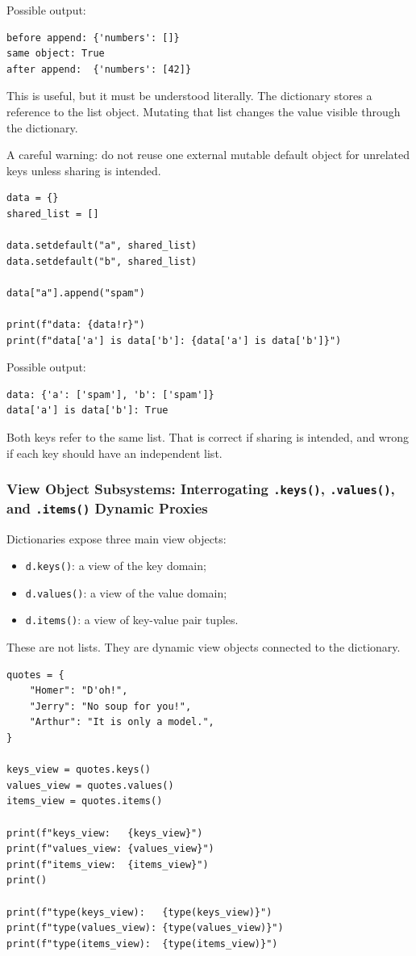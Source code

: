 Possible output:

\begin{verbatim}
before append: {'numbers': []}
same object: True
after append:  {'numbers': [42]}
\end{verbatim}

This is useful, but it must be understood literally. The dictionary stores a reference to the list object. Mutating that list changes the value visible through the dictionary.

A careful warning: do not reuse one external mutable default object for unrelated keys unless sharing is intended.

\begin{verbatim}
data = {}
shared_list = []

data.setdefault("a", shared_list)
data.setdefault("b", shared_list)

data["a"].append("spam")

print(f"data: {data!r}")
print(f"data['a'] is data['b']: {data['a'] is data['b']}")
\end{verbatim}

Possible output:

\begin{verbatim}
data: {'a': ['spam'], 'b': ['spam']}
data['a'] is data['b']: True
\end{verbatim}

Both keys refer to the same list. That is correct if sharing is intended, and wrong if each key should have an independent list.

\subsubsection{View Object Subsystems: Interrogating \texttt{.keys()}, \texttt{.values()}, and \texttt{.items()} Dynamic Proxies}

Dictionaries expose three main view objects:

\begin{itemize}
    \item \texttt{d.keys()}: a view of the key domain;
    \item \texttt{d.values()}: a view of the value domain;
    \item \texttt{d.items()}: a view of key-value pair tuples.
\end{itemize}

These are not lists. They are dynamic view objects connected to the dictionary.

\begin{verbatim}
quotes = {
    "Homer": "D'oh!",
    "Jerry": "No soup for you!",
    "Arthur": "It is only a model.",
}

keys_view = quotes.keys()
values_view = quotes.values()
items_view = quotes.items()

print(f"keys_view:   {keys_view}")
print(f"values_view: {values_view}")
print(f"items_view:  {items_view}")
print()

print(f"type(keys_view):   {type(keys_view)}")
print(f"type(values_view): {type(values_view)}")
print(f"type(items_view):  {type(items_view)}")
\end{verbatim}

